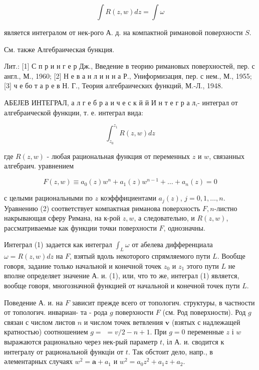 \documentclass[10pt]{article}
\begin{document}
\[

\int R(z, w) d z=\int \omega

\]



является интегралом от нек-рого А. д. на компактной римановой поверхности $S$.



См. также Алгебраическая бункция.



Лит.: [1] С п р и н г е р Дж., Введение в теорию римановых поверхностей, пер. с англ., М., 1960; [2] Н е в а н л и н н а Р., Униформизация, пер. с нем., М., 1955; [3] ч е бо т а р е в Н. Г., Теория алгебраических функций, М.-Л., 1948.



АБЕЈЕВ ИНТЕГРАЛ, а л $г$ е б р а и ч е с к й й И н т е г р а л,- интеграл от алгебраической функции, т. е. интеграл вида:



\[

\int_{z_{0}}^{z_{1}} R(z, w) d z

\]



где $R(z, w)$ - любая рациональная функция от переменных $z$ и $w$, связанных алгебраич. уравнением



\[

F(z, w) \equiv a_{0}(z) w^{n}+a_{1}(z) w^{n-1}+\ldots+a_{n}(z)=0

\]



с целыми рациональными по $z$ коэфффициентами $a_{j}(z)$, $j=0,1, \ldots, n$. Уравнению (2) соответствует компактная риманова поверхность $F, n$-листно накрывающая сферу Римана, на к-рой $z, w$, а следовательно, и $R(z, w)$, рассматриваемые как функции точки поверхности $F$, однозначны.



Интеграл (1) задается как интеграл $\int_{L} \omega$ от абелева дифференциала $\omega=R(z, w) d z$ на $F$, взятый вдоль некоторого спрямляемого пути $L$. Вообще говоря, задание только начальной и конечной точек $z_{0}$ и $z_{1}$ этого пути $L$ не вполне определяет значение А. и. (1), или, что то же, интеграл (1) является, вообще говоря, многозначной функцией от начальной и конечной точек пути $L$.



Поведение А. и. на $F$ зависит прежде всего от топологич. структуры, в частности от топологич. инвариан- та - рода $g$ поверхности $F$ (см. Род поверхности). Род $g$ связан с числом листов $n$ и числом точек ветвления $\boldsymbol{v}$ (взятых с надлежащей кратностью) соотношением $g=$ $=v / 2-n+1$. При $g=0$ переменные $z$ і $w$ выражаются рационально через нек-рый параметр $t$, іл А. и. сводится к интегралу от рациональной функціи от $t$. Так обстоит дело, напр., в әлементарных случаях $w^{2}=\boldsymbol{a}+a_{1}$ и $w^{2}=a_{0} z^{2}+a_{1} z+a_{2}$.
\end{document}
